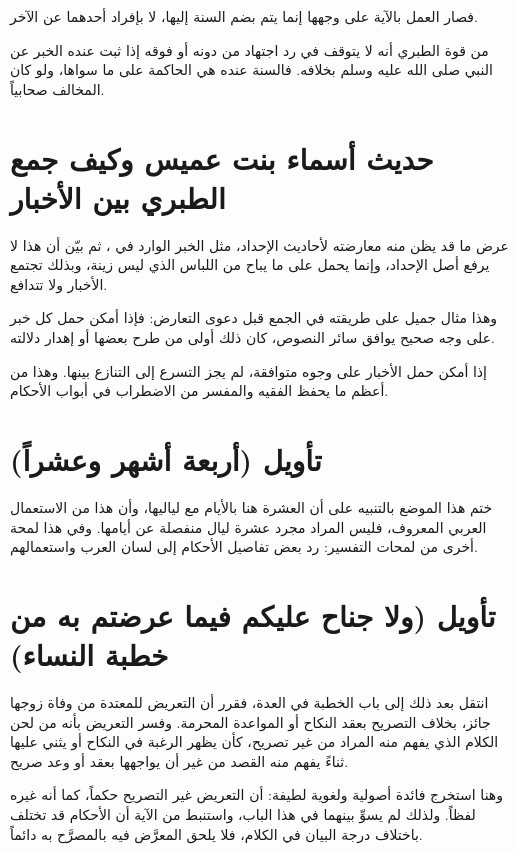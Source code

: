 فصار العمل بالآية على وجهها إنما يتم بضم السنة إليها، لا بإفراد أحدهما عن الآخر.

\begin{fawaid}
من قوة الطبري أنه لا يتوقف في رد اجتهاد من دونه أو فوقه إذا ثبت عنده الخبر عن النبي صلى الله عليه وسلم بخلافه. فالسنة عنده هي الحاكمة على ما سواها، ولو كان المخالف صحابياً.
\end{fawaid}

\section{حديث أسماء بنت عميس وكيف جمع الطبري بين الأخبار}
عرض  ما قد يظن منه معارضته لأحاديث الإحداد، مثل الخبر الوارد في ، ثم بيّن أن هذا لا يرفع أصل الإحداد، وإنما يحمل على ما يباح من اللباس الذي ليس زينة، وبذلك تجتمع الأخبار ولا تتدافع.

وهذا مثال جميل على طريقته في الجمع قبل دعوى التعارض: فإذا أمكن حمل كل خبر على وجه صحيح يوافق سائر النصوص، كان ذلك أولى من طرح بعضها أو إهدار دلالته.

\begin{fawaid}
إذا أمكن حمل الأخبار على وجوه متوافقة، لم يجز التسرع إلى التنازع بينها. وهذا من أعظم ما يحفظ الفقيه والمفسر من الاضطراب في أبواب الأحكام.
\end{fawaid}

\section{تأويل (أربعة أشهر وعشراً)}
ختم  هذا الموضع بالتنبيه على أن العشرة هنا بالأيام مع لياليها، وأن هذا من الاستعمال العربي المعروف، فليس المراد مجرد عشرة ليال منفصلة عن أيامها. وفي هذا لمحة أخرى من لمحات التفسير: رد بعض تفاصيل الأحكام إلى لسان العرب واستعمالهم.

\section{تأويل (ولا جناح عليكم فيما عرضتم به من خطبة النساء)}
انتقل  بعد ذلك إلى باب الخطبة في العدة، فقرر أن التعريض للمعتدة من وفاة زوجها جائز، بخلاف التصريح بعقد النكاح أو المواعدة المحرمة. وفسر التعريض بأنه من لحن الكلام الذي يفهم منه المراد من غير تصريح، كأن يظهر الرغبة في النكاح أو يثني عليها ثناءً يفهم منه القصد من غير أن يواجهها بعقد أو وعد صريح.

وهنا استخرج  فائدة أصولية ولغوية لطيفة: أن التعريض غير التصريح حكماً، كما أنه غيره لفظاً. ولذلك لم يسوِّ بينهما في هذا الباب، واستنبط من الآية أن الأحكام قد تختلف باختلاف درجة البيان في الكلام، فلا يلحق المعرَّض فيه بالمصرَّح به دائماً.

